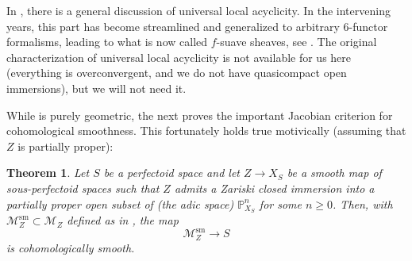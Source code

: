 \documentclass[11pt]{amsart}
\numberwithin{equation}{section}
\newtheorem{theorem}{Theorem}
\numberwithin{theorem}{section}
\theoremstyle{definition}
\begin{document}
In \cite[Section IV.2]{FarguesScholze}, there is a general discussion of universal local acyclicity. In the intervening years, this part has become streamlined and generalized to arbitrary $6$-functor formalisms, leading to what is now called $f$-suave sheaves, see \cite[Definition 4.4.1]{HeyerMann}. The original characterization \cite[Definition IV.2.1]{FarguesScholze} of universal local acyclicity is not available for us here (everything is overconvergent, and we do not have quasicompact open immersions), but we will not need it.

While \cite[Section IV.3]{FarguesScholze} is purely geometric, the next \cite[Section IV.4]{FarguesScholze} proves the important Jacobian criterion for cohomological smoothness. This fortunately holds true motivically (assuming that $Z$ is partially proper):

\begin{theorem}\label{thm:jacobiancriterion} Let $S$ be a perfectoid space and let $Z\to X_S$ be a smooth map of sous-perfectoid spaces such that $Z$ admits a Zariski closed immersion into a partially proper open subset of (the adic space) $\mathbb P^n_{X_S}$ for some $n\geq 0$. Then, with $\mathcal M_Z^{\mathrm{sm}}\subset \mathcal M_Z$ defined as in \cite{FarguesScholze}, the map
\[
\mathcal M_Z^{\mathrm{sm}}\to S
\]
is cohomologically smooth.
\end{theorem}
\end{document}
